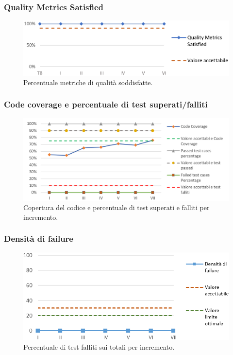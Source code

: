 \subsubsection{Quality Metrics Satisﬁed}
\begin{figure}[h]
	\centering
	\includegraphics[width=16cm]{Images/metriche}
	\caption{Percentuale metriche di qualità soddisfatte.}
\end{figure}

\newpage

\subsubsection{Code coverage e percentuale di test superati/falliti}
\begin{figure}[h]
	\centering
	\includegraphics[width=17cm]{Images/codeCov}
	\caption{Copertura del codice e percentuale di test superati e falliti per incremento.}
\end{figure}

\subsubsection{Densità di failure}
\begin{figure}[h]
	\centering
	\includegraphics[width=15cm]{Images/densFailure}
	\caption{Percentuale di test falliti sui totali per incremento.}
\end{figure}

